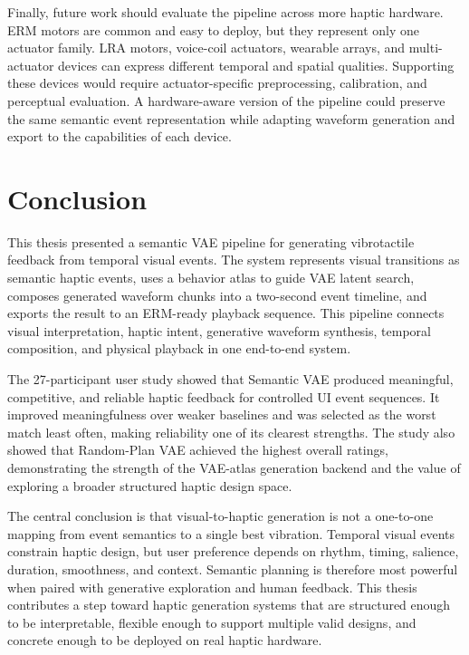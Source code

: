 Finally, future work should evaluate the pipeline across more haptic hardware. ERM motors are common and easy to deploy, but they represent only one actuator family. LRA motors, voice-coil actuators, wearable arrays, and multi-actuator devices can express different temporal and spatial qualities. Supporting these devices would require actuator-specific preprocessing, calibration, and perceptual evaluation. A hardware-aware version of the pipeline could preserve the same semantic event representation while adapting waveform generation and export to the capabilities of each device.

\section{Conclusion}

This thesis presented a semantic VAE pipeline for generating vibrotactile feedback from temporal visual events. The system represents visual transitions as semantic haptic events, uses a behavior atlas to guide VAE latent search, composes generated waveform chunks into a two-second event timeline, and exports the result to an ERM-ready playback sequence. This pipeline connects visual interpretation, haptic intent, generative waveform synthesis, temporal composition, and physical playback in one end-to-end system.

The 27-participant user study showed that Semantic VAE produced meaningful, competitive, and reliable haptic feedback for controlled UI event sequences. It improved meaningfulness over weaker baselines and was selected as the worst match least often, making reliability one of its clearest strengths. The study also showed that Random-Plan VAE achieved the highest overall ratings, demonstrating the strength of the VAE-atlas generation backend and the value of exploring a broader structured haptic design space.

The central conclusion is that visual-to-haptic generation is not a one-to-one mapping from event semantics to a single best vibration. Temporal visual events constrain haptic design, but user preference depends on rhythm, timing, salience, duration, smoothness, and context. Semantic planning is therefore most powerful when paired with generative exploration and human feedback. This thesis contributes a step toward haptic generation systems that are structured enough to be interpretable, flexible enough to support multiple valid designs, and concrete enough to be deployed on real haptic hardware.
